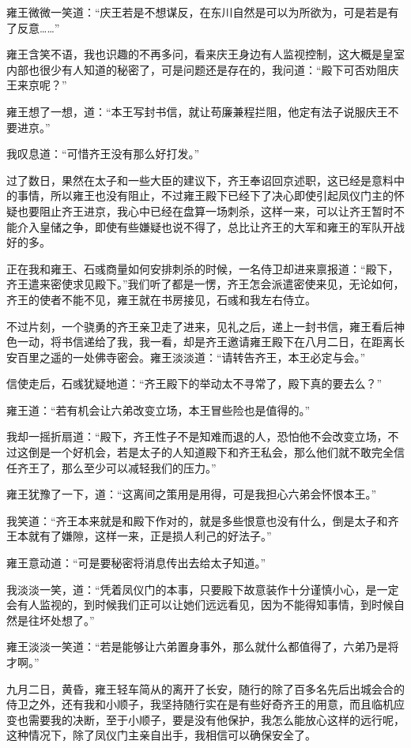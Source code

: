 雍王微微一笑道：“庆王若是不想谋反，在东川自然是可以为所欲为，可是若是有了反意……”

雍王含笑不语，我也识趣的不再多问，看来庆王身边有人监视控制，这大概是皇室内部也很少有人知道的秘密了，可是问题还是存在的，我问道：“殿下可否劝阻庆王来京呢？”

雍王想了一想，道：“本王写封书信，就让苟廉兼程拦阻，他定有法子说服庆王不要进京。”

我叹息道：“可惜齐王没有那么好打发。”

过了数日，果然在太子和一些大臣的建议下，齐王奉诏回京述职，这已经是意料中的事情，所以雍王也没有阻止，不过雍王殿下已经下了决心即使引起凤仪门主的怀疑也要阻止齐王进京，我心中已经在盘算一场刺杀，这样一来，可以让齐王暂时不能介入皇储之争，即使有些嫌疑也说不得了，总比让齐王的大军和雍王的军队开战好的多。

正在我和雍王、石彧商量如何安排刺杀的时候，一名侍卫却进来禀报道：“殿下，齐王遣来密使求见殿下。”我们听了都是一愣，齐王怎会派遣密使来见，无论如何，齐王的使者不能不见，雍王就在书房接见，石彧和我左右侍立。

不过片刻，一个骁勇的齐王亲卫走了进来，见礼之后，递上一封书信，雍王看后神色一动，将书信递给了我，我一看，却是齐王邀请雍王殿下在八月二日，在距离长安百里之遥的一处佛寺密会。雍王淡淡道：“请转告齐王，本王必定与会。”

信使走后，石彧犹疑地道：“齐王殿下的举动太不寻常了，殿下真的要去么？”

雍王道：“若有机会让六弟改变立场，本王冒些险也是值得的。”

我却一摇折扇道：“殿下，齐王性子不是知难而退的人，恐怕他不会改变立场，不过这倒是一个好机会，若是太子的人知道殿下和齐王私会，那么他们就不敢完全信任齐王了，那么至少可以减轻我们的压力。”

雍王犹豫了一下，道：“这离间之策用是用得，可是我担心六弟会怀恨本王。”

我笑道：“齐王本来就是和殿下作对的，就是多些恨意也没有什么，倒是太子和齐王本就有了嫌隙，这样一来，正是损人利己的好法子。”

雍王意动道：“可是要秘密将消息传出去给太子知道。”

我淡淡一笑，道：“凭着凤仪门的本事，只要殿下故意装作十分谨慎小心，是一定会有人监视的，到时候我们正可以让她们远远看见，因为不能得知事情，到时候自然是往坏处想了。”

雍王淡淡一笑道：“若是能够让六弟置身事外，那么就什么都值得了，六弟乃是将才啊。”

九月二日，黄昏，雍王轻车简从的离开了长安，随行的除了百多名先后出城会合的侍卫之外，还有我和小顺子，我坚持随行实在是有些好奇齐王的用意，而且临机应变也需要我的决断，至于小顺子，要是没有他保护，我怎么能放心这样的远行呢，这种情况下，除了凤仪门主亲自出手，我相信可以确保安全了。

